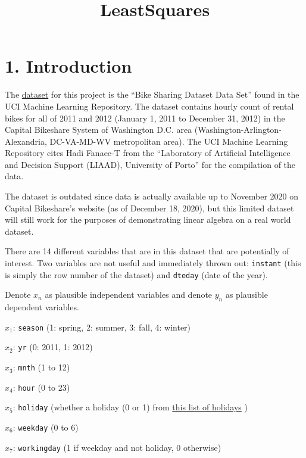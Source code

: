\documentclass[
]{article}
\title{LeastSquares}
\author{}
\date{\vspace{-2.5em}}
\begin{document}
\maketitle

\hypertarget{introduction}{%
\section{1. Introduction}\label{introduction}}

The \color{blue}
\href{https://www.archive.ics.uci.edu/ml/datasets/Bike+Sharing+Dataset}{dataset}
\color{black} for this project is the ``Bike Sharing Dataset Data Set''
found in the UCI Machine Learning Repository. The dataset contains
hourly count of rental bikes for all of 2011 and 2012 (January 1, 2011
to December 31, 2012) in the Capital Bikeshare System of Washington D.C.
area (Washington-Arlington-Alexandria, DC-VA-MD-WV metropolitan area).
The UCI Machine Learning Repository cites Hadi Fanaee-T from the
``Laboratory of Artificial Intelligence and Decision Support (LIAAD),
University of Porto'' for the compilation of the data.

The dataset is outdated since data is actually available up to November
2020 on Capital Bikeshare's website (as of December 18, 2020), but this
limited dataset will still work for the purposes of demonstrating linear
algebra on a real world dataset.

There are 14 different variables that are in this dataset that are
potentially of interest. Two variables are not useful and immediately
thrown out: \texttt{instant} (this is simply the row number of the
dataset) and \texttt{dteday} (date of the year).

Denote \(x_{n}\) as plausible independent variables and denote \(y_{n}\)
as plausible dependent variables.

\(x_{1}\): \texttt{season} (1: spring, 2: summer, 3: fall, 4: winter)

\(x_{2}\): \texttt{yr} (0: 2011, 1: 2012)

\(x_{3}\): \texttt{mnth} (1 to 12)

\(x_{4}\): \texttt{hour} (0 to 23)

\(x_{5}\): \texttt{holiday} (whether a holiday (0 or 1) from
\color{blue}
\href{https://dchrc.dc.gov/page/holiday-schedule}{this list of holidays}
\color{black} )

\(x_{6}\): \texttt{weekday} (0 to 6)

\(x_{7}\): \texttt{workingday} (1 if weekday and not holiday, 0
otherwise)
\end{document}

